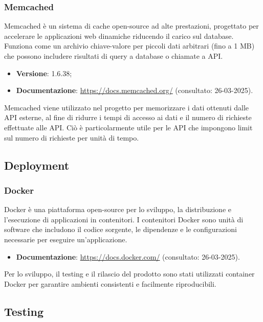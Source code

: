 \subsubsection{Memcached}
Memcached è un sistema di cache open-source ad alte prestazioni, progettato per
accelerare le applicazioni web dinamiche riducendo il carico sul database.
Funziona come un archivio chiave-valore per piccoli dati arbitrari (fino a 1
MB) che possono includere risultati di query a database o chiamate a API.
\begin{itemize}
    \item \textbf{Versione}: 1.6.38;
    \item \textbf{Documentazione}: \url{https://docs.memcached.org/} (consultato:
          26-03-2025).
\end{itemize}
Memcached viene utilizzato nel progetto per memorizzare i dati ottenuti dalle API esterne,
al fine di ridurre i tempi di accesso ai dati e il numero di richieste
effettuate alle API. Ciò è particolarmente utile per le API che impongono limit sul numero di richieste per unità di tempo.

\subsection{Deployment}
\subsubsection{Docker}
Docker è una piattaforma open-source per lo sviluppo, la distribuzione e
l'esecuzione di applicazioni in contenitori. I contenitori Docker sono unità di software che includono il codice sorgente, le dipendenze e le
configurazioni necessarie per eseguire un'applicazione.
\begin{itemize}
    \item \textbf{Documentazione}: \url{https://docs.docker.com/} (consultato:
          26-03-2025).
\end{itemize}
Per lo sviluppo, il testing e il rilascio del prodotto sono stati utilizzati container Docker per garantire ambienti consistenti e facilmente riproducibili.

\subsection{Testing}
